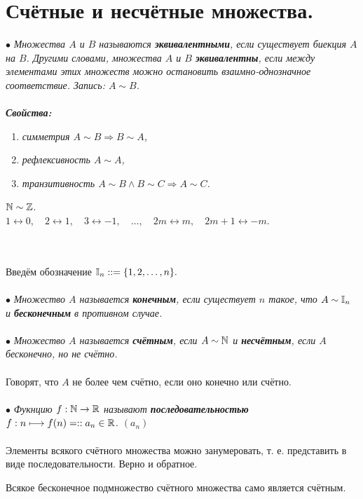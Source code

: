 \section{Счётные и несчётные множества.}
$\bullet$ \textit{Множества $A$ и $B$ называются \textbf{эквивалентными}, если существует биекция $A$ на $B$. Другими словами, множества $A$ и $B$ \textbf{эквивалентны}, если между элементами этих множеств можно остановить взаимно-однозначное соответствие. Запись: $A \sim B$.}\\\\
\textbf{\textit{Свойства:}}
\begin{enumerate}
	\item \textit{симметрия $A \sim B \Rightarrow B \sim A$,}
	\item \textit{рефлексивность $ A \sim A$,}
	\item \textit{транзитивность $A \sim B \wedge B \sim C \Rightarrow A \sim C$.}
\end{enumerate}
\begin{example} $\mathbb{N} \sim \mathbb{Z}$.\\
	$1 \longleftrightarrow 0, \quad 2 \longleftrightarrow 1, \quad 3 \longleftrightarrow -1,\quad \dots,\quad 2m \longleftrightarrow m, \quad 2m+1 \longleftrightarrow -m$.
\end{example}\\\\
Введём обозначение $\mathbb{I}_n ::= \{1, 2, \dots, n\}.$\\\\
$\bullet$ \textit{Множество $A$ называется \textbf{конечным}, если существует $n$ такое, что $A \sim \mathbb{I}_n$ и \textbf{бесконечным} в противном случае.}\\\\
$\bullet$ \textit{Множество $A$ называется \textbf{счётным}, если $A \sim \mathbb{N}$ и \textbf{несчётным}, если $A$ бесконечно, но не счётно.}\\\\
Говорят, что $A$ не более чем счётно, если оно конечно или счётно.\\\\
$\bullet$ \textit{Фукнцию $f : \mathbb{N} \rightarrow \mathbb{R}$ называют \textbf{последовательностью} $f : n \longmapsto f(n) =:: a_n \in \mathbb{R}$. \quad \quad $(a_n)$}\\\\
Элементы всякого счётного множества можно занумеровать, т. е. представить в виде последовательности. Верно и обратное.
\begin{theorem} Всякое бесконечное подмножество счётного множества само является счётным.
\end{theorem}

